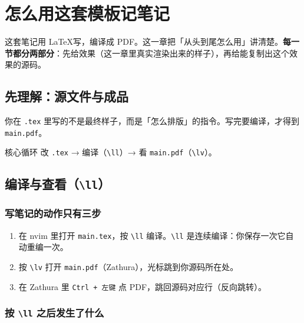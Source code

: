 

\chapter{怎么用这套模板记笔记}
\label{ch:start}

这套笔记用 \LaTeX 写，编译成 PDF。这一章把「从头到尾怎么用」讲清楚。\textbf{每一节都分两部分}：先给效果（这一章里真实渲染出来的样子），再给能复制出这个效果的源码。

\section{先理解：源文件与成品}

你在 \texttt{.tex} 里写的不是最终样子，而是「怎么排版」的指令。写完要编译，才得到 \texttt{main.pdf}。

\begin{notebox}[bl]{核心循环}
改 \texttt{.tex} → 编译（\texttt{\textbackslash ll}）→ 看 \texttt{main.pdf}（\texttt{\textbackslash lv}）。
\end{notebox}

\section{编译与查看（\texttt{\textbackslash ll}）}

\subsection{写笔记的动作只有三步}

\begin{enumerate}
  \item 在 nvim 里打开 \texttt{main.tex}，按 \texttt{\textbackslash ll} 编译。\texttt{\textbackslash ll} 是连续编译：你保存一次它自动重编一次。
  \item 按 \texttt{\textbackslash lv} 打开 \texttt{main.pdf}（Zathura），光标跳到你源码所在处。
  \item 在 Zathura 里 \texttt{Ctrl + 左键} 点 PDF，跳回源码对应行（反向跳转）。
\end{enumerate}

\subsection{按 \texttt{\textbackslash ll} 之后发生了什么}

